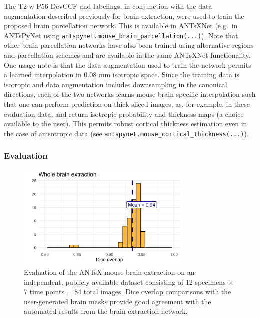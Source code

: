 \documentclass[
  12pt,
]{article}
\begin{document}
The T2-w P56 DevCCF and labelings, in conjunction with the data
augmentation described previously for brain extraction, were used to
train the proposed brain parcellation network. This is available in
ANTsXNet (e.g.~in ANTsPyNet using
\texttt{antspynet.mouse\_brain\_parcellation(...)}). Note that other
brain parcellation networks have also been trained using alternative
regions and parcellation schemes and are available in the same ANTsXNet
functionality. One usage note is that the data augmentation used to
train the network permits a learned interpolation in 0.08 mm isotropic
space. Since the training data is isotropic and data augmentation
includes downsampling in the canonical directions, each of the two
networks learns mouse brain-specific interpolation such that one can
perform prediction on thick-sliced images, as, for example, in these
evaluation data, and return isotropic probability and thickness maps (a
choice available to the user). This permits robust cortical thickness
estimation even in the case of anisotropic data (see
\texttt{antspynet.mouse\_cortical\_thickness(...)}).

\subsubsection{Evaluation}\label{evaluation}

\begin{figure}
\centering
  \includegraphics[width=0.75\textwidth]{Figures/diceWholeBrain.png}
\caption{Evaluation of the ANTsX mouse brain extraction on an
independent, publicly available dataset consisting of 12 specimens $\times$ 7
time points = 84 total images.  Dice overlap comparisons with the
user-generated brain masks provide good agreement with the automated results
from the brain extraction network.}
\label{fig:evaluation}
\end{figure}
\end{document}
